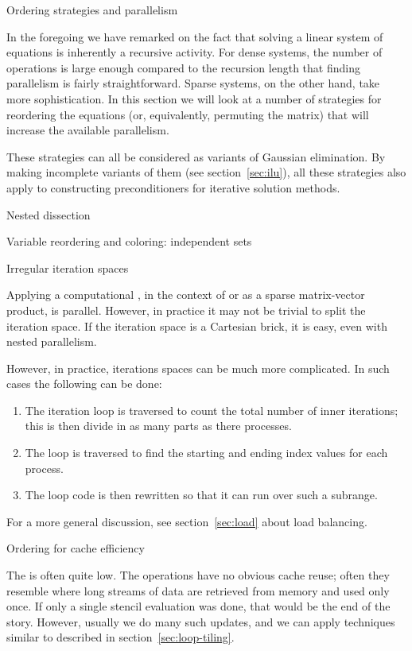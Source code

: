  {Ordering strategies and parallelism}
\label{sec:ordering}

In the foregoing we have remarked on the fact that solving
a linear system of equations is inherently a recursive activity.
For dense systems, the number of operations is large enough
compared to the recursion length that finding parallelism 
is fairly straightforward. Sparse systems, on the other hand,
take more sophistication. In this section we will look at 
a number of strategies for reordering the equations (or, equivalently,
permuting the matrix) that will increase the available parallelism.

These strategies can all be considered as variants of Gaussian elimination.
By making incomplete variants of them (see section~\ref{sec:ilu}),
all these strategies also apply to constructing preconditioners
for iterative solution methods.

 {Nested dissection}
\label{sec:dissection}


 {Variable reordering and coloring: independent sets}
\label{sec:redblackgreen}


 {Irregular iteration spaces}
\label{sec:iterationspace}

Applying a computational , in the context of
%
or as a sparse matrix-vector product, is parallel. However, in
practice it may not be trivial to split the iteration space. If the
iteration space is a Cartesian brick, it is easy, even with nested
parallelism.

However, in practice, iterations spaces can be much more complicated.
In such cases the following can be done:
\begin{enumerate}
\item The iteration loop is traversed to count the total number of inner
  iterations; this is then divide in as many parts as there processes.
\item The loop is traversed to find the starting and ending index
  values for each process.
\item The loop code is then rewritten so that it can run over such a subrange.
\end{enumerate}
For a more general discussion,
see section~\ref{sec:load} about load balancing.

 {Ordering for cache efficiency}
\label{sec:fd-oblivious}

The  is often quite
low. The operations have no obvious cache reuse; often they resemble
%
 where long streams of data are retrieved
from memory and used only once. If only a single stencil evaluation
was done, that would be the end of the story. However, usually we do
many such updates, and we can apply techniques similar to
%
 described in section~\ref{sec:loop-tiling}.

